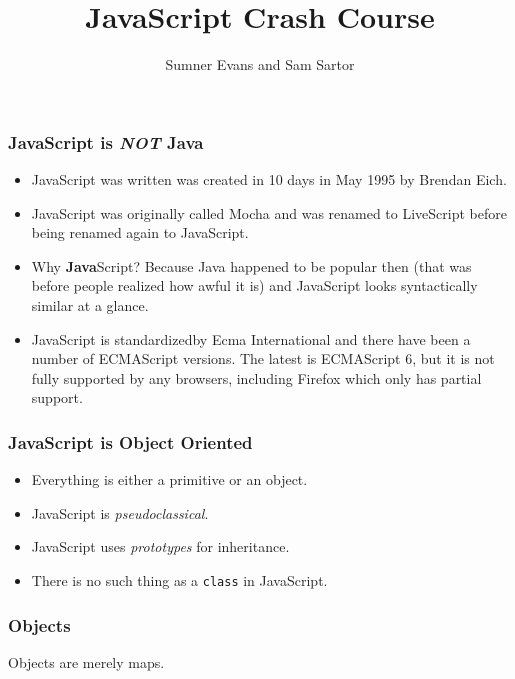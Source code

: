 \documentclass{lug}
\title{JavaScript Crash Course}
\author{Sumner Evans and Sam Sartor}
\begin{document}
\begin{frame}
    \frametitle{JavaScript is \textbf{\textit{NOT}} Java \footnotemark[1]}

    \begin{itemize}[<+->]
        \item JavaScript was written was created in 10 days in May 1995 by Brendan Eich.
        \item JavaScript was originally called Mocha and was renamed to LiveScript before being
            renamed again to JavaScript.
        \item Why \textbf{Java}Script? Because Java happened to be popular then (that was before
            people realized how awful it is) and JavaScript looks syntactically similar at a glance.
        \item JavaScript is standardized\footnotemark[2] by Ecma International and there have been a
            number of ECMAScript versions. The latest is ECMAScript 6, but it is not fully supported
            by any browsers, including Firefox which only has partial support.
    \end{itemize}

\end{frame}

\begin{frame}
    \frametitle{JavaScript is Object Oriented}

    \begin{itemize}[<+->]
        \item Everything is either a primitive or an object.
        \item JavaScript is \textit{pseudoclassical}.
        \item JavaScript uses \textit{prototypes} for inheritance.
        \item There is no such thing as a \texttt{class} in JavaScript.\footnotemark[1]
    \end{itemize}

\end{frame}

\begin{frame}
    \frametitle{Objects}

    Objects are merely maps.
\end{frame}
\end{document}
